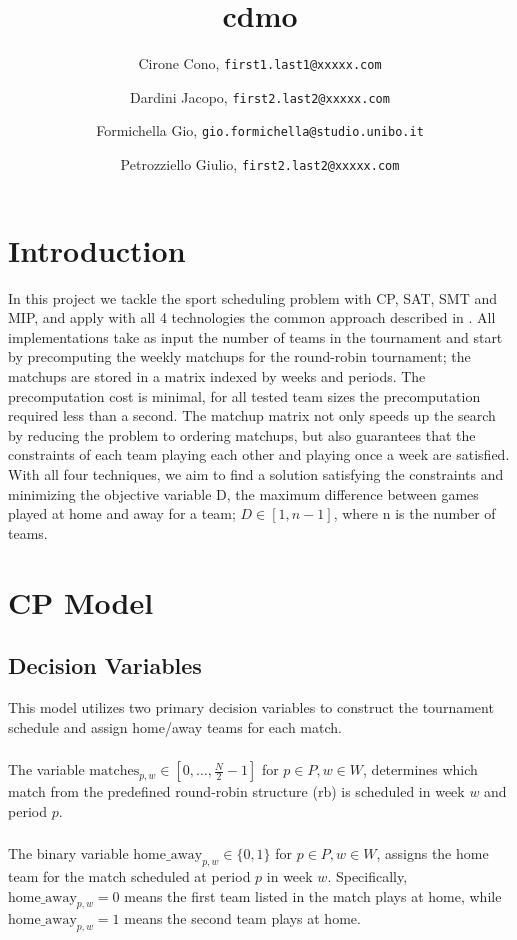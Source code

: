 \documentclass{article}
\title{cdmo}
\author{
  Cirone Cono, \texttt{first1.last1@xxxxx.com}
  \and
  Dardini Jacopo, \texttt{first2.last2@xxxxx.com}
  \and
  Formichella Gio, \texttt{gio.formichella@studio.unibo.it}
  \and
  Petrozziello Giulio, \texttt{first2.last2@xxxxx.com}
}
\date{}
\begin{document}
\maketitle

\section{Introduction}
In this project we tackle the sport scheduling problem with CP, SAT, SMT and MIP, and apply with all 4 technologies the common approach described in \cite{10.1007/10704567_6}. All implementations take as input the number of teams in the tournament and start by precomputing the weekly matchups for the round-robin tournament; the matchups are stored in a matrix indexed by weeks and periods. The precomputation cost is minimal, for all tested team sizes the precomputation required less than a second. The matchup matrix not only speeds up the search by reducing the problem to ordering matchups, but also guarantees that the constraints of each team playing each other and playing once a week are satisfied. With all four techniques, we aim to find a solution satisfying the constraints and minimizing the objective variable D, the maximum difference between games played at home and away for a team; $D\in [1, n-1]$, where n is the number of teams. 

\section{CP Model}
\subsection{Decision Variables}
This model utilizes two primary decision variables to construct the tournament schedule and assign home/away teams for each match.

\subsubsection{}
The variable $\text{matches}_{p, w} \in [0, \dots, \frac{N}{2} - 1]$ for $p \in P, w \in W$, determines which match from the predefined round-robin structure ($\text{rb}$) is scheduled in week $w$ and period $p$.

\subsubsection{}
The binary variable $\text{home\_away}_{p, w} \in \{0, 1\}$ for $p \in P, w \in W$, assigns the home team for the match scheduled at period $p$ in week $w$. Specifically, $\text{home\_away}_{p, w} = 0$ means the first team listed in the match plays at home, while $\text{home\_away}_{p, w} = 1$ means the second team plays at home.
\end{document}
